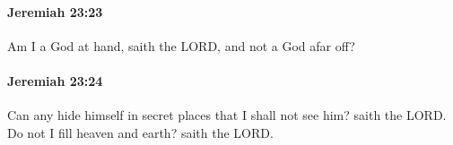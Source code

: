 		\paragraph{Jeremiah 23:23} %
			\label{JEREMIAH-23-23}

			Am I a God at hand, saith the LORD, and not a God afar off?


		\paragraph{Jeremiah 23:24} %
			\label{JEREMIAH-23-24}

			Can any hide himself in secret places that I shall not see him? saith the LORD. Do not I fill heaven and earth? saith the LORD.


